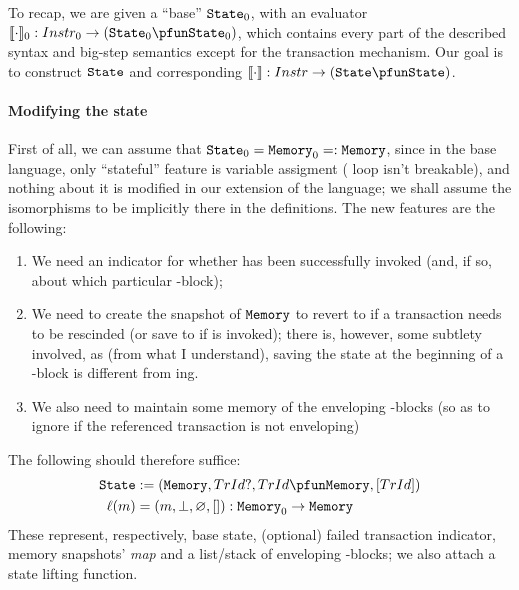 \documentclass{../../psv}
\begin{document}
  To recap, we are given a ``base'' $\mathtt{State}_0$, with an evaluator $\eval{\cdot}_0: Instr_0 \to (\State_0 \pfun \State_0)$, which contains every part of the described syntax and big-step semantics except for the transaction mechanism. Our goal is to construct $\mathtt{State}$ and corresponding $\eval{\cdot}: Instr \to (\State \pfun \State)$.

  \paragraph{Modifying the state} First of all, we can assume that $\mathtt{State}_0 = \mathtt{Memory}_0 =: \mathtt{Memory}$, since in the base language, only ``stateful'' feature is variable assigment ( loop isn't breakable), and nothing about it is modified in our extension of the language; we shall assume the isomorphisms to be implicitly there in the definitions. The new features are the following:
  \begin{enumerate}
    \item We need an indicator for whether  has been successfully invoked (and, if so, about which particular -block);
    \item We need to create the snapshot of $\mathtt{Memory}$ to revert to if a transaction needs to be rescinded (or save to if  is invoked); there is, however, some subtlety involved, as (from what I understand), saving the state at the beginning of a -block is different from ing.
    \item We also need to maintain some memory of the enveloping -blocks (so as to ignore  if the referenced transaction is not enveloping)
  \end{enumerate}
  The following should therefore suffice:
  \begin{align*}
    \hs{State} &:= (\hs{Memory}, TrId?, TrId \pfun \hs{Memory}, \hslist{TrId})\\
    \ell(m) &= (m, \bot, \varnothing, []): \hs{Memory}_0 \to \hs{Memory}
  \end{align*}
  These represent, respectively, base state, (optional) failed transaction indicator, memory snapshots' \emph{map} and a list/stack of enveloping -blocks; we also attach a state lifting function.
\end{document}
